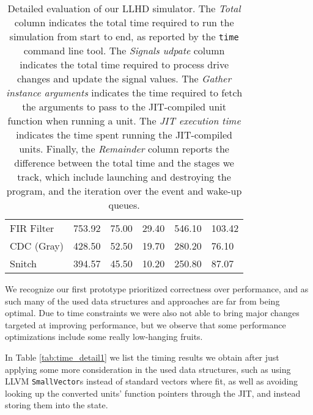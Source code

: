 \begin{table}
{\begin{tabular}{llllll}
            FIR Filter      & 753.92                 & 75.00                              & 29.40                              & 546.10                              & 103.42                              \\
            CDC (Gray)      & 428.50                 & 52.50                              & 19.70                              & 280.20                              & 76.10                               \\
            Snitch          & 394.57                 & 45.50                              & 10.20                              & 250.80                              & 87.07                               \\ \bottomrule
        \end{tabular}
    }
    \caption[Detailed performance evaluation for our LLHD simulator.]{Detailed evaluation of our LLHD simulator. The \textit{Total} column indicates the total time required to run the simulation from start to end, as reported by the \texttt{time} command line tool. The \textit{Signals udpate} column indicates the total time required to process drive changes and update the signal values. The \textit{Gather instance arguments} indicates the time required to fetch the arguments to pass to the JIT-compiled unit function when running a unit. The \textit{JIT execution time} indicates the time spent running the JIT-compiled units. Finally, the \textit{Remainder} column reports the difference between the total time and the stages we track, which include launching and destroying the program, and the iteration over the event and wake-up queues.}
    \label{tab:time_detail0}
\end{table}

We recognize our first prototype prioritized correctness over performance, and as such many of the used data structures and approaches are far from being optimal. Due to time constraints we were also not able to bring major changes targeted at improving performance, but we observe that some performance optimizations include some really low-hanging fruits.

In Table \ref{tab:time_detail1} we list the timing results we obtain after just applying some more consideration in the used data structures, such as using LLVM \texttt{SmallVector}s instead of standard vectors where fit, as well as avoiding looking up the converted units' function pointers through the JIT, and instead storing them into the state.

